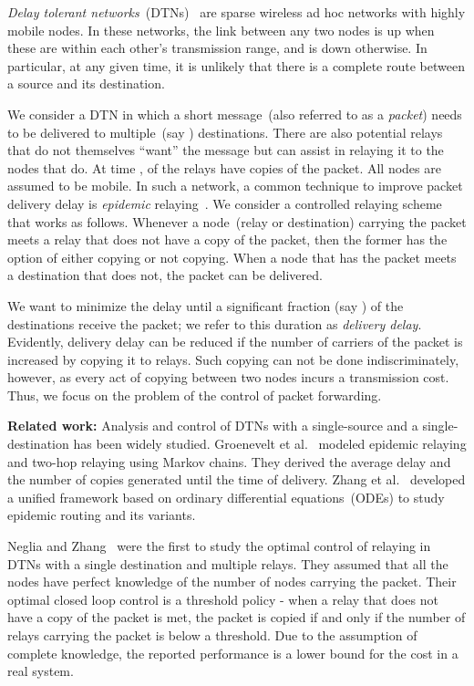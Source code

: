 \documentclass[10pt,journal,letterpaper]{IEEEtran}
\begin{document}
{\it Delay tolerant networks}~(DTNs)~\cite{comnet-dtn.fall03dtn-architecture}
 are sparse wireless ad hoc networks with highly mobile nodes.
In these networks, the link between any two nodes is up when these are
within each other's transmission range, and is down otherwise. In
particular, at any given time, it is unlikely that there is a complete route between a source and its
destination.


We consider a DTN in which a short message~(also referred to as a
{\it packet}) needs to be delivered to multiple~(say )
destinations. There are also  potential relays that do not
themselves ``want'' the message but can assist in relaying it to the
nodes that do. At time ,  of the relays have copies of the
packet. All nodes are assumed to be mobile. In such a network, a
common technique to improve packet delivery delay is {\it epidemic}
relaying~\cite{comnet-dtn.vahdat-becker00epidemic-routing}. We
consider a controlled relaying scheme that works as follows.
Whenever a node~(relay or destination) carrying the packet meets a
relay that does not have a copy of the packet, then the former has
the option of either copying or not copying. When a node that has
the packet meets a destination that does not, the packet can be
delivered.


We want to minimize the delay until a significant fraction (say ) of the destinations receive the packet;
we refer to this duration as {\it delivery delay}.
Evidently, delivery delay can be reduced if the number of carriers of
the packet is increased by copying it to relays. Such copying can not be
done indiscriminately, however, as every act of copying between two
nodes incurs a transmission cost. Thus, we focus
on the problem of the control of packet forwarding.

\noindent
{\bf Related work:} Analysis and control of DTNs with a single-source
and a single-destination has been widely studied. Groenevelt et
al.~\cite{comnet-dtn.groenevelt-etal05message-delay-mobile-networks}
modeled epidemic relaying and two-hop relaying using Markov chains.
They derived the average delay and the number of copies generated until
the time of delivery. Zhang et
al.~\cite{comnet-dtn.zhang-etal07epidemic-routing} developed a unified
framework based on ordinary differential equations~(ODEs) to study epidemic
routing and its variants.

Neglia and Zhang~\cite{ctrltheory-dtn.neglia-zhang06optimal-delay-power-tradeoff}
were the first to study the optimal control of relaying in
DTNs with a single destination and multiple relays. They
assumed that all the nodes have perfect knowledge of the number of nodes carrying the packet.
Their optimal closed loop control is a threshold policy - when a relay that does not have a copy
of the packet is met, the packet
is copied if and only if the number of relays carrying the packet is below a threshold.
Due to the assumption of complete knowledge, the reported performance is a lower bound for the cost in a real
system.
\end{document}
